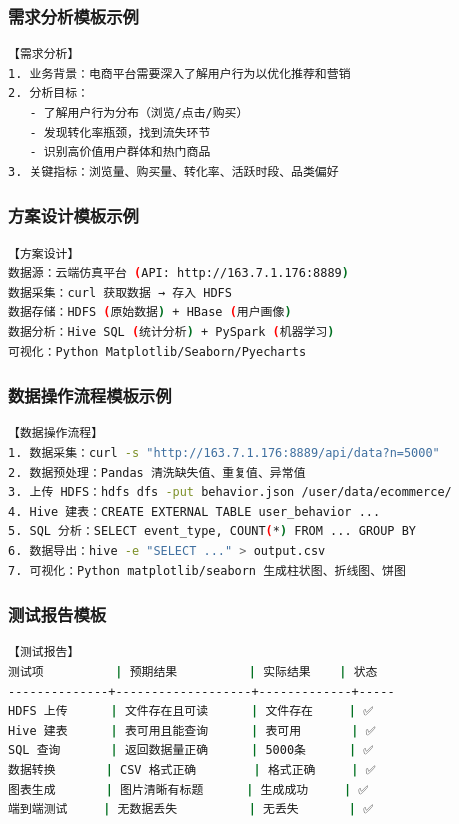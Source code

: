 \documentclass[12pt,a4paper]{article}
\begin{document}
\subsubsection{需求分析模板示例}

\begin{lstlisting}[language=bash]
【需求分析】
1. 业务背景：电商平台需要深入了解用户行为以优化推荐和营销
2. 分析目标：
   - 了解用户行为分布（浏览/点击/购买）
   - 发现转化率瓶颈，找到流失环节
   - 识别高价值用户群体和热门商品
3. 关键指标：浏览量、购买量、转化率、活跃时段、品类偏好
\end{lstlisting}

\subsubsection{方案设计模板示例}

\begin{lstlisting}[language=bash]
【方案设计】
数据源：云端仿真平台 (API: http://163.7.1.176:8889)
数据采集：curl 获取数据 → 存入 HDFS
数据存储：HDFS (原始数据) + HBase (用户画像)
数据分析：Hive SQL (统计分析) + PySpark (机器学习)
可视化：Python Matplotlib/Seaborn/Pyecharts
\end{lstlisting}

\subsubsection{数据操作流程模板示例}

\begin{lstlisting}[language=bash]
【数据操作流程】
1. 数据采集：curl -s "http://163.7.1.176:8889/api/data?n=5000"
2. 数据预处理：Pandas 清洗缺失值、重复值、异常值
3. 上传 HDFS：hdfs dfs -put behavior.json /user/data/ecommerce/
4. Hive 建表：CREATE EXTERNAL TABLE user_behavior ...
5. SQL 分析：SELECT event_type, COUNT(*) FROM ... GROUP BY
6. 数据导出：hive -e "SELECT ..." > output.csv
7. 可视化：Python matplotlib/seaborn 生成柱状图、折线图、饼图
\end{lstlisting}

\subsubsection{测试报告模板}

\begin{lstlisting}[language=bash]
【测试报告】
测试项          | 预期结果          | 实际结果    | 状态
--------------+-------------------+-------------+-----
HDFS 上传      | 文件存在且可读      | 文件存在     | ✅
Hive 建表      | 表可用且能查询      | 表可用       | ✅
SQL 查询       | 返回数据量正确      | 5000条      | ✅
数据转换       | CSV 格式正确        | 格式正确     | ✅
图表生成       | 图片清晰有标题      | 生成成功     | ✅
端到端测试     | 无数据丢失          | 无丢失       | ✅
\end{lstlisting}
\end{document}
